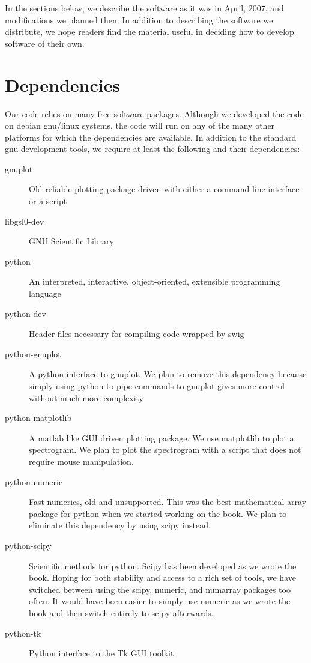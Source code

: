 In the sections below, we describe the software as it was in April,
2007, and modifications we planned then.  In addition to describing
the software we distribute, we hope readers find the material useful
in deciding how to develop software of their own.

\section{Dependencies}
\label{sec:SWdep}

Our code relies on many free software packages.  Although we developed
the code on debian gnu/linux systems, the code will run on any of the
many other platforms for which the dependencies are available.  In
addition to the standard gnu development tools, we require at least
the following and their dependencies:
  \begin{description}
  \item[gnuplot] Old reliable plotting package driven with either a
    command line interface or a script
  \item[libgsl0-dev] GNU Scientific Library
  \item[python] An interpreted, interactive, object-oriented,
    extensible programming language
  \item[python-dev] Header files necessary for compiling code wrapped
    by swig
  \item[python-gnuplot] A python interface to gnuplot.  We plan to
    remove this dependency because simply using python to pipe commands to
    gnuplot gives more control without much more complexity
  \item[python-matplotlib] A matlab like GUI driven plotting package.
    We use matplotlib to plot a spectrogram.  We plan to plot the
    spectrogram with a script that does not require mouse
    manipulation.
  \item[python-numeric] Fast numerics, old and unsupported.  This was
    the best mathematical array package for python when we started
    working on the book.  We plan to eliminate this dependency by
    using scipy instead.
  \item[python-scipy] Scientific methods for python.  Scipy has been
    developed as we wrote the book.  Hoping for both stability and
    access to a rich set of tools, we have switched between using the
    scipy, numeric, and numarray packages too often.  It would have
    been easier to simply use numeric as we wrote the book and then
    switch entirely to scipy afterwards.
  \item[python-tk] Python interface to the Tk GUI toolkit

\end{description}
